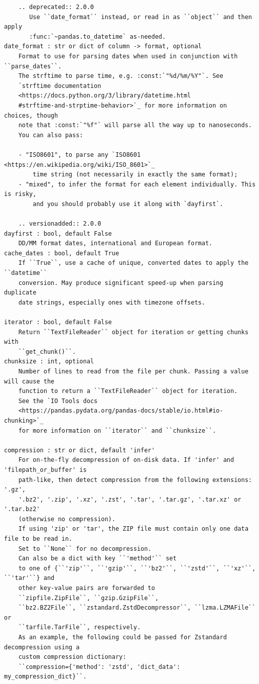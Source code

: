 \documentclass[
  letterpaper,
  DIV=11,
  numbers=noendperiod]{scrreprt}
\begin{document}
\begin{verbatim}
    .. deprecated:: 2.0.0
       Use ``date_format`` instead, or read in as ``object`` and then apply
       :func:`~pandas.to_datetime` as-needed.
date_format : str or dict of column -> format, optional
    Format to use for parsing dates when used in conjunction with ``parse_dates``.
    The strftime to parse time, e.g. :const:`"%d/%m/%Y"`. See
    `strftime documentation
    <https://docs.python.org/3/library/datetime.html
    #strftime-and-strptime-behavior>`_ for more information on choices, though
    note that :const:`"%f"` will parse all the way up to nanoseconds.
    You can also pass:

    - "ISO8601", to parse any `ISO8601 <https://en.wikipedia.org/wiki/ISO_8601>`_
        time string (not necessarily in exactly the same format);
    - "mixed", to infer the format for each element individually. This is risky,
        and you should probably use it along with `dayfirst`.

    .. versionadded:: 2.0.0
dayfirst : bool, default False
    DD/MM format dates, international and European format.
cache_dates : bool, default True
    If ``True``, use a cache of unique, converted dates to apply the ``datetime``
    conversion. May produce significant speed-up when parsing duplicate
    date strings, especially ones with timezone offsets.

iterator : bool, default False
    Return ``TextFileReader`` object for iteration or getting chunks with
    ``get_chunk()``.
chunksize : int, optional
    Number of lines to read from the file per chunk. Passing a value will cause the
    function to return a ``TextFileReader`` object for iteration.
    See the `IO Tools docs
    <https://pandas.pydata.org/pandas-docs/stable/io.html#io-chunking>`_
    for more information on ``iterator`` and ``chunksize``.

compression : str or dict, default 'infer'
    For on-the-fly decompression of on-disk data. If 'infer' and 'filepath_or_buffer' is
    path-like, then detect compression from the following extensions: '.gz',
    '.bz2', '.zip', '.xz', '.zst', '.tar', '.tar.gz', '.tar.xz' or '.tar.bz2'
    (otherwise no compression).
    If using 'zip' or 'tar', the ZIP file must contain only one data file to be read in.
    Set to ``None`` for no decompression.
    Can also be a dict with key ``'method'`` set
    to one of {``'zip'``, ``'gzip'``, ``'bz2'``, ``'zstd'``, ``'xz'``, ``'tar'``} and
    other key-value pairs are forwarded to
    ``zipfile.ZipFile``, ``gzip.GzipFile``,
    ``bz2.BZ2File``, ``zstandard.ZstdDecompressor``, ``lzma.LZMAFile`` or
    ``tarfile.TarFile``, respectively.
    As an example, the following could be passed for Zstandard decompression using a
    custom compression dictionary:
    ``compression={'method': 'zstd', 'dict_data': my_compression_dict}``.


\end{verbatim}
\end{document}

